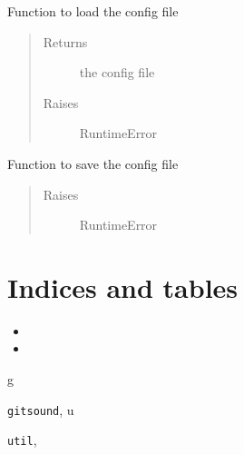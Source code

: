 \documentclass[letterpaper,10pt,english]{sphinxmanual}
\begin{document}

\begin{fulllineitems}
\label{code:util.load_config}
Function to load the config file
\begin{quote}\begin{description}
\item[{Returns}] \leavevmode
the config file

\item[{Raises}] \leavevmode
RuntimeError

\end{description}\end{quote}

\end{fulllineitems}


\begin{fulllineitems}
\label{code:util.save_config}
Function to save the config file
\begin{quote}\begin{description}
\item[{Raises}] \leavevmode
RuntimeError

\end{description}\end{quote}

\end{fulllineitems}



\chapter{Indices and tables}
\label{index:indices-and-tables}\begin{itemize}
\item {} 

\item {} 

\end{itemize}


\renewcommand{\indexname}{Python Module Index}
\begin{theindex}
\def\bigletter#1{{\Large\sffamily#1}\nopagebreak\vspace{1mm}}
\bigletter{g}
\item {\texttt{gitsound}}, \pageref{code:module-gitsound}
\indexspace
\bigletter{u}
\item {\texttt{util}}, \pageref{code:module-util}
\end{theindex}

\renewcommand{\indexname}{Index}
\printindex
\end{document}
